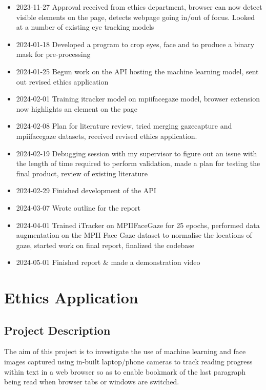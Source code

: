 \documentclass{report}
\begin{document}
\begin{itemize}
    \item 2023-11-27 Approval received from ethics department, browser can now detect visible elements on the page, detects webpage going in/out of focus. Looked at a number of existing eye tracking models   
    \item 2024-01-18 Developed a program to crop eyes, face and to produce a binary mask for pre-processing 
    \item 2024-01-25 Begun work on the API hosting the machine learning model, sent out revised ethics application 
    \item 2024-02-01 Training itracker model on mpiifacegaze model, browser extension now highlights an element on the page 
    \item 2024-02-08 Plan for literature review, tried merging gazecapture and mpiifacegaze datasets, received revised ethics application. 
    \item 2024-02-19 Debugging session with my supervisor to figure out an issue with the length of time required to perform validation, made a plan for testing the final product, review of existing literature 
    \item 2024-02-29 Finished development of the API 
    \item 2024-03-07 Wrote outline for the report
    \item 2024-04-01 Trained iTracker on MPIIFaceGaze for 25 epochs, performed data augmentation on the MPII Face Gaze dataset to normalise the locations of gaze, started work on final report, finalized the codebase 
    \item 2024-05-01 Finished report \& made a demonstration video 
\end{itemize}

\chapter{Ethics Application}\label{sec:ethics-app}

\section*{Project Description}

The aim of this project is to investigate the use of machine learning and face images captured using in-built laptop/phone cameras to track reading progress within text in a web browser so as to enable bookmark of the last paragraph being read when browser tabs or windows are switched.
\end{document}

